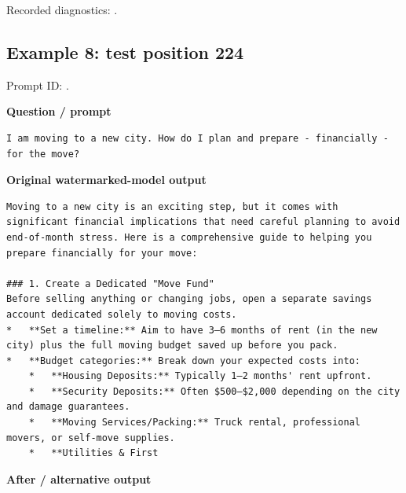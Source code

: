 Recorded diagnostics:
\texttt{}.

\subsection{Example 8: test position
224}\label{record-docs-watermarking-qualitative-text-textseal2-bira-md-example-8-test-position-224}

Prompt ID:
\texttt{}.

\textbf{Question / prompt}

\begin{Verbatim}
I am moving to a new city. How do I plan and prepare - financially - for the move?
\end{Verbatim}

\textbf{Original watermarked-model output}

\begin{Verbatim}
Moving to a new city is an exciting step, but it comes with significant financial implications that need careful planning to avoid end-of-month stress. Here is a comprehensive guide to helping you prepare financially for your move:

### 1. Create a Dedicated "Move Fund"
Before selling anything or changing jobs, open a separate savings account dedicated solely to moving costs.
*   **Set a timeline:** Aim to have 3–6 months of rent (in the new city) plus the full moving budget saved up before you pack.
*   **Budget categories:** Break down your expected costs into:
    *   **Housing Deposits:** Typically 1–2 months' rent upfront.
    *   **Security Deposits:** Often $500–$2,000 depending on the city and damage guarantees.
    *   **Moving Services/Packing:** Truck rental, professional movers, or self-move supplies.
    *   **Utilities & First
\end{Verbatim}

\textbf{After / alternative output}

